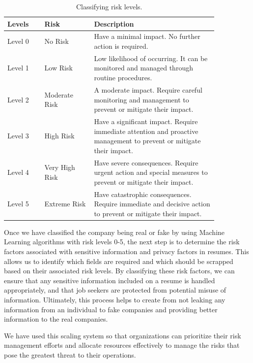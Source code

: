 \documentclass{article}
\begin{document}
\begin{table}
    \centering
    \begin{tabular}{|p{0.15\linewidth}|p{0.2\linewidth}|p{0.5\linewidth}|}
        \hline
        \textbf{Levels} & \textbf{Risk} & \textbf{Description}\\
        \hline
        Level 0 & No Risk & Have a minimal impact. No further action is required.\\
        \hline
        Level 1 & Low Risk & Low likelihood of occurring. It can be monitored and managed through routine procedures.\\
        \hline
        Level 2 & Moderate Risk & A moderate impact. Require careful monitoring and management to prevent or mitigate their impact.\\
        \hline
        Level 3 & High Risk & Have a significant impact. Require immediate attention and proactive management to prevent or mitigate their impact.\\
        \hline
        Level 4 & Very High Risk & Have severe consequences. Require urgent action and special measures to prevent or mitigate their impact.\\
        \hline
        Level 5 & Extreme Risk & Have catastrophic consequences. Require immediate and decisive action to prevent or mitigate their impact.\\
        \hline
    \end{tabular}
    \caption{\label{demo-table} Classifying risk levels.}
\end{table}









Once we have classified the company being real or fake by using Machine Learning algorithms with risk levels 0-5, the next step is to determine the risk factors associated with sensitive information and privacy factors in resumes. This allows us to identify which fields are required and which should be scrapped based on their associated risk levels. By classifying these risk factors, we can ensure that any sensitive information included on a resume is handled appropriately, and that job seekers are protected from potential misuse of information. Ultimately, this process helps to create from not leaking any information from an individual to fake companies and providing better information to the real companies.

We have used this scaling system so that organizations can prioritize their risk management efforts and allocate resources effectively to manage the risks that pose the greatest threat to their operations.
\end{document}
